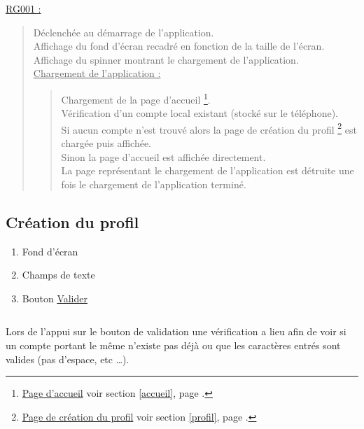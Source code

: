 \documentclass{report}
\begin{document}
		\underline{RG001 :}
		\begin{quote}
			Déclenchée au démarrage de l'application.\\
			Affichage du fond d'écran recadré en fonction de la taille de l'écran.\\
			Affichage du spinner montrant le chargement de l'application.\\
			\underline{Chargement de l'application :}
				\begin{quote}
					Chargement de la page d'accueil%
					\footnote[1]{
						\hyperlink{Page d'accueil}{Page d'accueil}
						\og voir section \ref{accueil}, page \pageref{accueil}.\fg
					}.\\
					Vérification d'un compte local existant (stocké sur le téléphone).\\
					Si aucun compte n'est trouvé alors la page de création du profil%
					\footnote[2]{
						\hyperlink{Création du profil}{Page de création du profil}
						\og voir section \ref{profil}, page \pageref{profil}.\fg
					}
					est chargée puis affichée.\\
					Sinon la page d'accueil%
					\footnotemark[1]
					est affichée directement. \\
					La page représentant le chargement de l'application est détruite une fois le chargement de l'application terminé.\\
				\end{quote}
		\end{quote}

	
\newpage

	\subsection{Création du profil}
		\hypertarget{Création du profil}{}
		\label{profil}
	
		
		
		\begin{enumerate}
		  \item Fond d'écran
		  \item Champs de texte
		  \item Bouton \hyperlink{Page d'accueil}{Valider}
		\end{enumerate}
			
		$\,$
		
		Lors de l'appui sur le bouton de validation une vérification a lieu afin de
		voir si un compte portant le même n'existe pas déjà ou que les caractères
		entrés sont valides (pas d'espace, etc \ldots). \\		
		
\end{document}

